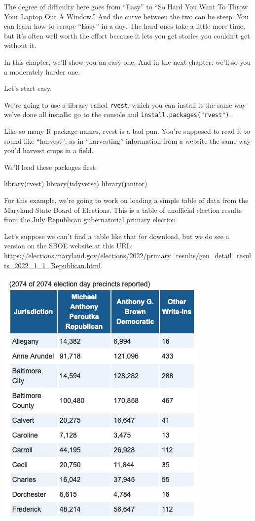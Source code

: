 \documentclass[
  letterpaper,
  DIV=11,
  numbers=noendperiod]{scrreprt}
\newenvironment{Shaded}{\begin{snugshade}}{\end{snugshade}}
\newcommand{\FunctionTok}[1]{\textcolor[rgb]{0.28,0.35,0.67}{#1}}
\newcommand{\NormalTok}[1]{\textcolor[rgb]{0.00,0.23,0.31}{#1}}
\begin{document}
The degree of difficulty here goes from ``Easy'' to ``So Hard You Want
To Throw Your Laptop Out A Window.'' And the curve between the two can
be steep. You can learn how to scrape ``Easy'' in a day. The hard ones
take a little more time, but it's often well worth the effort because it
lets you get stories you couldn't get without it.

In this chapter, we'll show you an easy one. And in the next chapter,
we'll so you a moderately harder one.

Let's start easy.

We're going to use a library called \texttt{rvest}, which you can
install it the same way we've done all installs: go to the console and
\texttt{install.packages("rvest")}.

Like so many R package names, rvest is a bad pun. You're supposed to
read it to sound like ``harvest'', as in ``harvesting'' information from
a website the same way you'd harvest crops in a field.

We'll load these packages first:

\begin{Shaded}
\begin{Highlighting}[]
\FunctionTok{library}\NormalTok{(rvest)}
\FunctionTok{library}\NormalTok{(tidyverse)}
\FunctionTok{library}\NormalTok{(janitor)}
\end{Highlighting}
\end{Shaded}

For this example, we're going to work on loading a simple table of data
from the Maryland State Board of Elections. This is a table of
unofficial election results from the July Republican gubernatorial
primary election.

Let's suppose we can't find a table like that for download, but we do
see a version on the SBOE website at this URL:
\url{https://elections.maryland.gov/elections/2022/primary_results/gen_detail_results_2022_1_1_Republican.html}.

\includegraphics{./images/rvest1.png}
\end{document}
